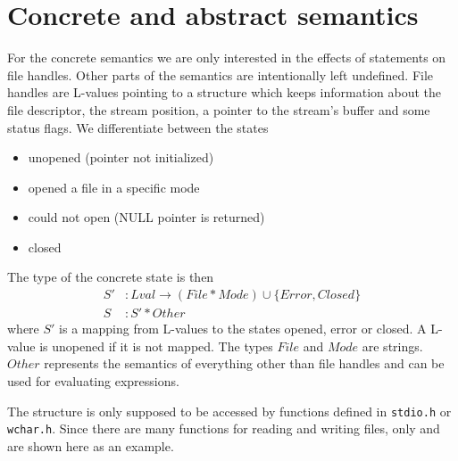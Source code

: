 \section{Concrete and abstract semantics}
For the concrete semantics we are only interested in the effects of statements on file handles. Other parts of the semantics are intentionally left undefined.
File handles are L-values pointing to a structure  which keeps information about the file descriptor, the stream position, a pointer to the stream's buffer and some status flags.
We differentiate between the states
\begin{itemize}
\item unopened (pointer not initialized)
\item opened a file in a specific mode
\item could not open (NULL pointer is returned)
\item closed
\end{itemize}
The type of the concrete state is then %
\begin{align}
S' &: \mathit{Lval} \to (\mathit{File} * \mathit{Mode}) \cup \{\mathit{Error}, \mathit{Closed}\}\\
S  &: S' * \mathit{Other}
\end{align}
where $S'$ is a mapping from L-values to the states opened, error or closed. A L-value is unopened if it is not mapped.
The types $\mathit{File}$ and $\mathit{Mode}$ are strings.
$\mathit{Other}$ represents the semantics of everything other than file handles and can be used for evaluating expressions.

The  structure is only supposed to be accessed by functions defined in \verb|stdio.h| or \verb|wchar.h|.
Since there are many functions for reading and writing files, only  and  are shown here as an example.

%


